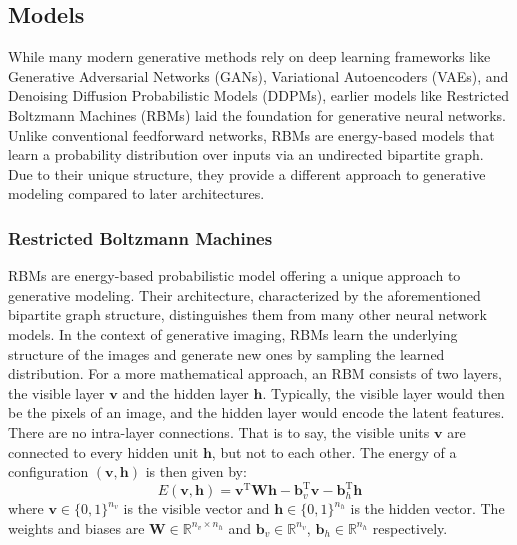 \documentclass{article}
\begin{document}
\subsection{Models}
While many modern generative methods rely on deep learning frameworks like Generative Adversarial Networks (GANs), Variational Autoencoders (VAEs), and Denoising Diffusion Probabilistic Models (DDPMs), earlier models like Restricted Boltzmann Machines (RBMs) laid the foundation for generative neural networks. Unlike conventional feedforward networks, RBMs are energy-based models that learn a probability distribution over inputs via an undirected bipartite graph. Due to their unique structure, they provide a different approach to generative modeling compared to later architectures.
\subsubsection{Restricted Boltzmann Machines}
RBMs are energy-based probabilistic model offering a unique approach to generative modeling. Their architecture, characterized by the aforementioned bipartite graph structure, distinguishes them from many other neural network models.\newline
In the context of generative imaging, RBMs learn the underlying structure of the images and generate new ones by sampling the learned distribution. \newline
For a more mathematical approach, an RBM consists of two layers, the visible layer $\mathbf{v}$ and the hidden layer $\mathbf{h}$. Typically, the visible layer would then be the pixels of an image, and the hidden layer would encode the latent features. There are no intra-layer connections. That is to say, the visible units $\mathbf{v}$ are connected to every hidden unit $\mathbf{h}$, but not to each other.
\newline
The energy of a configuration $(\mathbf{v}, \mathbf{h})$ is then given by:
\begin{equation} \label{energy}
    E(\mathbf{v}, \mathbf{h}) = \mathbf{v}^\text{T} \mathbf{W}\mathbf{h} - \mathbf{b}_v^\text{T}\mathbf{v} - \mathbf{b}_h^\text{T}\mathbf{h}
\end{equation}
where $\mathbf{v} \in \{0, 1\}^{n_v}$ is the visible vector and $\mathbf{h} \in \{0,1\}^{n_h}$ is the hidden vector. \newline
The weights and biases are $\mathbf{W}\in \mathbb{R}^{n_v \times n_h}$ and $\mathbf{b}_v \in \mathbb{R}^{n_v}$, $\mathbf{b}_h \in \mathbb{R}^{n_h}$ respectively.
\newline
\end{document}

